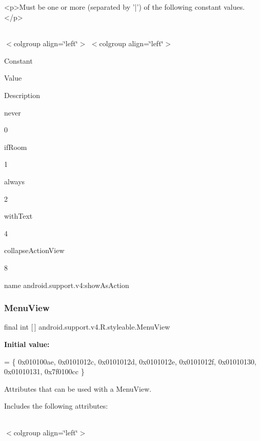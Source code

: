 \begin{DoxyVerb}      <p>Must be one or more (separated by '|') of the following constant values.</p>
\end{DoxyVerb}
 \tabulinesep=1mm
\begin{longtabu} spread 0pt [c]{*{0}{|X[-1]}|}
\hline
\end{longtabu}
$<$colgroup align=\char`\"{}left\char`\"{}$>$ $<$colgroup align=\char`\"{}left\char`\"{}$>$ 

Constant

Value

Description 

{\ttfamily never}

0

{\ttfamily if\+Room}

1

{\ttfamily always}

2

{\ttfamily with\+Text}

4

{\ttfamily collapse\+Action\+View}

8

name android.\+support.\+v4\+:show\+As\+Action \mbox{\label{classandroid_1_1support_1_1v4_1_1R_1_1styleable_a6f981f3b295d914b69b142c57cdfcabf}} 
\subsubsection{\texorpdfstring{Menu\+View}{MenuView}}
{\footnotesize\ttfamily final int \mbox{[}$\,$\mbox{]} android.\+support.\+v4.\+R.\+styleable.\+Menu\+View\hspace{0.3cm}{\ttfamily [static]}}

{\bfseries Initial value\+:}
\begin{DoxyCode}
= \{
            0x010100ae, 0x0101012c, 0x0101012d, 0x0101012e,
            0x0101012f, 0x01010130, 0x01010131, 0x7f0100cc
        \}
\end{DoxyCode}
Attributes that can be used with a Menu\+View. 

Includes the following attributes\+:

\tabulinesep=1mm
\begin{longtabu} spread 0pt [c]{*{0}{|X[-1]}|}
\hline
\end{longtabu}
$<$colgroup align=\char`\"{}left\char`\"{}$>$ 

